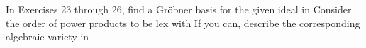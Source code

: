 \documentclass[11pt,oneside]{article}
\begin{document}
\begin{BookBody}


\noindent In Exercises 23 through 26, find a Gröbner basis for the given ideal in  Consider the order of power products to be lex with  If you can, describe the corresponding algebraic variety in 

\end{BookBody}

\BookNarrativefalse
\end{document}
